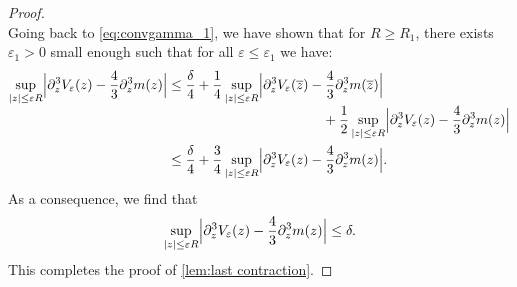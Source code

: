 \documentclass[10pt]{amsart}
\theoremstyle{plain}
\theoremstyle{definition}
\let\eps\varepsilon
\let\ds\displaystyle
\newcommand{\abs}[1]{\left\lvert#1\right\rvert}
\newcommand{\Babs}[1]{\Bigl\lvert#1\Bigr\rvert}
\newcommand{\bz}{\overline{z}}
\begin{document}
\begin{proof}
\begin{equation*}
\end{equation*}
Going back to \eqref{eq:convgamma_1}, we have shown that for $R\geq R_1$, there exists $\eps_1>0$ small enough such that for all $\eps \leq \eps_1$ we have:
\begin{align*}
\ds \sup_{\abs{z} \leq \eps R} \Babs{ \partial_z^3 V_\eps(z)- \frac43 \partial_z^3 m(z) }
& \leq \ds \frac\delta4 + \dfrac{1}{4} \sup_{\abs{z} \leq \eps R} \Babs{ \partial_z^3 V_\eps(\bz)- \frac43 \partial_z^3 m(\bz)}\\[-3pt]
&\hspace*{4cm} +
\dfrac{1}{2}\sup_{\abs{z} \leq \eps R} \Babs{ \partial_z^3 V_\eps(z)- \frac43 \partial_z^3 m(z)} \\
& \leq \frac\delta4 + \dfrac{3}{4} \sup_{\abs{z} \leq \eps R} \Babs{ \partial_z^3 V_\eps(z)- \frac43 \partial_z^3 m(z)}.
\end{align*}
As a consequence, we find that
\begin{align*}
\sup_{\abs{z} \leq \eps R} \Babs{ \partial_z^3 V_\eps(z)- \frac43 \partial_z^3 m(z) } \leq \delta.
\end{align*}
This completes the proof of \cref{lem:last contraction}.
\end{proof}
\end{document}
